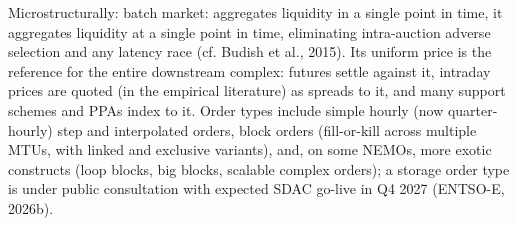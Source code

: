 \documentclass[12pt,a4paper]{cau_thesis}
\begin{document}
Microstructurally: batch market: aggregates liquidity in a single
point in time, it aggregates liquidity at a single point in time,
eliminating intra-auction adverse selection and any latency race (cf.
Budish et al., 2015). Its uniform price is the reference for the
entire downstream complex: futures settle against it, intraday prices
are quoted (in the empirical literature) as spreads to it, and many
support schemes and PPAs index to it. Order types include simple
hourly (now quarter-hourly) step and interpolated orders, block
orders (fill-or-kill across multiple MTUs, with linked and exclusive
variants), and, on some NEMOs, more exotic constructs (loop blocks,
big blocks, scalable complex orders); a storage order type is under
public consultation with expected SDAC go-live in Q4 2027 (ENTSO-E,
2026b).
\begin{figure}[htbp]
    \vspace*{0.5cm}
    \centering
    \label{fig:day_ahead_curves}
\end{figure}

\end{document}
